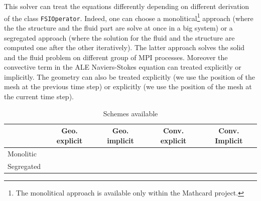 \documentclass[11pt]{article}
\newcommand{\tick}{\ding{51}}
\begin{document}
This solver can treat the equations differently depending on different derivation of the class \texttt{FSIOperator}.  Indeed, one can choose a monolitical\footnote{The monolitical approach is available only within the Mathcard project.} approach (where the the structure and the fluid part are solve at once in a big system) or a segregated approach (where the solution for the fluid and the structure are computed one after the other iteratively). The latter approach solves the solid and the fluid problem on different group of MPI processes. Moreover the convective term in the ALE Naviers-Stokes equation can treated explicitly or implicitly. The geometry can also be treated explicitly (we use the position of the mesh at the previous time step) or explicitly (we use the position of the mesh at the current time step).

\begin{table}[H]
\begin{center}
\begin{tabular}{l|c|c|c|c|}
& Geo. explicit & Geo. implicit & Conv. explicit & Conv. Implicit\\
\hline
Monolitic & \tick & \tick & \tick & \tick \\
Segregated & \tick & & \tick & \\
\end{tabular}
\end{center}
\caption{Schemes available}
\label{tab:FSISchemeAvailable}
\end{table}%
\end{document}
